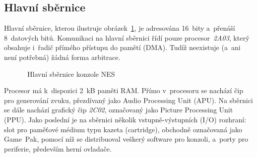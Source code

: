 \subsection{Hlavní sběrnice}
Hlavní sběrnice, kterou ilustruje obrázek~\ref{fig:nes-hlavnisbernice}, je adresována 16~bity a~přenáší 8~datových bitů. Komunikaci na hlavní sběrnici řídí pouze procesor~\emph{2A03}, který obsahuje i~řadič přímého přístupu do pamětí (DMA). Tudíž neexistuje (a~ani není potřebná) žádná forma arbitrace.

\begin{figure}[ht!]
	\centering
	\caption{~Hlavní sběrnice konzole NES}\label{fig:nes-hlavnisbernice}
\end{figure}

Procesor má k~dispozici 2~kB paměti RAM. Přímo v~procesoru se nachází čip pro generování zvuku, přezdívaný jako Audio Processing Unit (APU).  Na sběrnici se dále nachází grafický čip \emph{2C02}, označovaný jako Picture Processing Unit (PPU). Jako poslední je na sběrnici několik vstupně-výstupních (I/O) rozhraní: slot pro paměťové médium typu kazeta (cartridge), obchodně označovaná jako Game~Pak, pomocí níž se distribuoval veškerý software pro konzoli, a~porty pro periferie, především herní ovladače.

